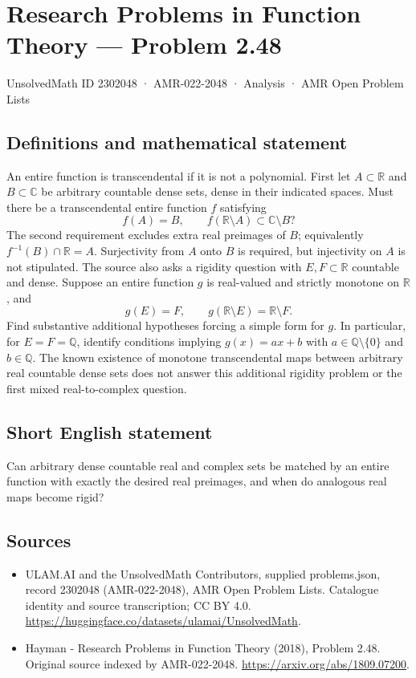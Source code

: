 \documentclass[11pt,a4paper]{article}
\begin{document}
\section*{Research Problems in Function Theory — Problem 2.48}\label{2302048}
{\small UnsolvedMath ID 2302048 · AMR-022-2048 · Analysis · AMR Open Problem Lists}
\subsection{Definitions and mathematical statement}
An entire function is transcendental if it is not a polynomial. First let $A\subset\mathbb R$ and $B\subset\mathbb C$ be arbitrary countable dense sets, dense in their indicated spaces. Must there be a transcendental entire function $f$ satisfying
\[
f(A)=B,\qquad f(\mathbb R\setminus A)\subset\mathbb C\setminus B?
\]
The second requirement excludes extra real preimages of $B$; equivalently $f^{-1}(B)\cap\mathbb R=A$. Surjectivity from $A$ onto $B$ is required, but injectivity on $A$ is not stipulated.
The source also asks a rigidity question with $E,F\subset\mathbb R$ countable and dense. Suppose an entire function $g$ is real-valued and strictly monotone on $\mathbb R$, and
\[
g(E)=F,\qquad g(\mathbb R\setminus E)=\mathbb R\setminus F.
\]
Find substantive additional hypotheses forcing a simple form for $g$. In particular, for $E=F=\mathbb Q$, identify conditions implying $g(x)=ax+b$ with $a\in\mathbb Q\setminus\{0\}$ and $b\in\mathbb Q$. The known existence of monotone transcendental maps between arbitrary real countable dense sets does not answer this additional rigidity problem or the first mixed real-to-complex question.
\subsection{Short English statement}
Can arbitrary dense countable real and complex sets be matched by an entire function with exactly the desired real preimages, and when do analogous real maps become rigid?
\subsection{Sources}
\begin{itemize}
\item[S1] ULAM.AI and the UnsolvedMath Contributors, supplied problems.json, record 2302048 (AMR-022-2048), AMR Open Problem Lists. Catalogue identity and source transcription; CC BY 4.0.
\url{https://huggingface.co/datasets/ulamai/UnsolvedMath}.
\item[S2] Hayman - Research Problems in Function Theory (2018), Problem 2.48. Original source indexed by AMR-022-2048.
\url{https://arxiv.org/abs/1809.07200}.
\end{itemize}
\end{document}
